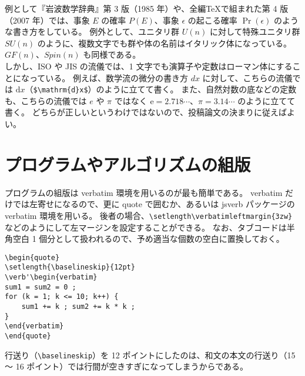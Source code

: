 例として『岩波数学辞典』第 3 版（1985 年）や、全編\TeX{}で組まれた第 4 版（2007 年）では、事象 $E$ の確率 $P(E)$、事象 $\epsilon$ の起こる確率 $\Pr(\epsilon)$ のような書き方をしている。
例外として、ユニタリ群 $U(n)$ に対して特殊ユニタリ群 $\mathit{SU}(n)$ のように、複数文字でも群や体の名前はイタリック体になっている。
$\mathit{GF}(n)$、$\mathit{Spin}(n)$ も同様である。\\

しかし、ISO や JIS の流儀では、1 文字でも演算子や定数はローマン体にすることになっている。
例えば、数学流の微分の書き方 $\mathit{dx}$ に対して、こちらの流儀では $\mathrm{d}x$（\verb`$\mathrm{d}x$`）のように立てて書く。
また、自然対数の底などの定数も、こちらの流儀では $e$ や $\pi$ ではなく $\mathrm{e}=2.718\cdots$、$\pi=3.14\cdots$ のように立てて書く。
どちらが正しいというわけではないので、投稿論文の決まりに従えばよい。
\section{プログラムやアルゴリズムの組版}
プログラムの組版は verbatim 環境を用いるのが最も簡単である。
verbatim だけでは左寄せになるので、更に quote で囲むか、あるいは jsverb パッケージの verbatim 環境を用いる。
後者の場合、\verb`\setlength\verbatimleftmargin{3zw}` などのようにして左マージンを設定することができる。
なお、タブコードは半角空白 1 個分として扱われるので、予め適当な個数の空白に置換しておく。
\begin{mdframed}[roundcorner=0.50zw,leftmargin=3.00zw,rightmargin=3.00zw,skipabove=0.40zw,skipbelow=0.40zw,innertopmargin=4.00pt,innerbottommargin=4.00pt,innerleftmargin=5.00pt,innerrightmargin=5.00pt,linecolor=gray!020,linewidth=0.50pt,backgroundcolor=gray!20]
\verb'\begin{quote}'                    \\
\verb'\setlength{\baselineskip}{12pt}'  \\
\verb`\verb'\begin{verbatim}`           \\
\verb'sum1 = sum2 = 0 ;'                \\
\verb'for (k = 1; k <= 10; k++) {'      \\
\verb'    sum1 += k ; sum2 += k * k ;'  \\
\verb'}'                                \\
\verb'\end{verbatim}'                   \\
\verb'\end{quote}'
\end{mdframed}
行送り（\verb`\baselineskip`）を 12 ポイントにしたのは、和文の本文の行送り（15 ～ 16 ポイント）では行間が空きすぎになってしまうからである。
